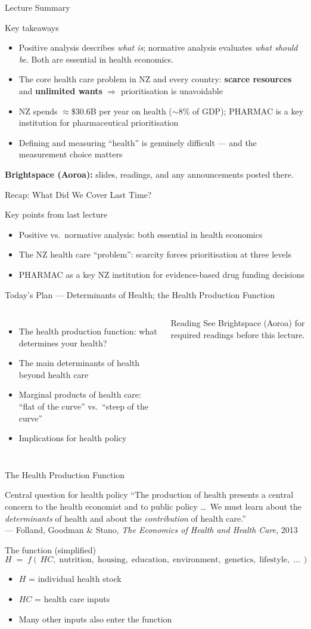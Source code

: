\documentclass[aspectratio=169, 12pt]{beamer}
\newcommand{\recapslide}[1]{%
  \begin{frame}{Recap: What Did We Cover Last Time?}
    \begin{block}{Key points from last lecture}
      \begin{itemize}#1\end{itemize}
    \end{block}
  \end{frame}}
\newcommand{\planslide}[2]{%
  \begin{frame}{Today's Plan — #1}
    \begin{columns}
      \column{0.6\textwidth}
      \begin{itemize}#2\end{itemize}
      \column{0.38\textwidth}
      \begin{alertblock}{Reading}
        \footnotesize See Brightspace (Aoroa) for required readings before this lecture.
      \end{alertblock}
    \end{columns}
  \end{frame}}
\newcommand{\summaryside}[1]{%
  \begin{frame}{Lecture Summary}
    \begin{exampleblock}{Key takeaways}
      \begin{itemize}#1\end{itemize}
    \end{exampleblock}
    \vspace{0.5em}
    {\footnotesize\textcolor{OtagoGold}{\textbf{Brightspace (Aoroa):}} slides, readings, and any announcements posted there.}
  \end{frame}}
\begin{document}
\summaryside{
  \item Positive analysis describes \emph{what is}; normative analysis evaluates \emph{what should be}. Both are essential in health economics.
  \item The core health care problem in NZ and every country: \textbf{scarce resources} and \textbf{unlimited wants} $\Rightarrow$ prioritisation is unavoidable
  \item NZ spends $\approx$\$30.6B per year on health ($\sim$8\% of GDP); PHARMAC is a key institution for pharmaceutical prioritisation
  \item Defining and measuring ``health'' is genuinely difficult --- and the measurement choice matters
}


\recapslide{
  \item Positive vs.\ normative analysis: both essential in health economics
  \item The NZ health care ``problem'': scarcity forces prioritisation at three levels
  \item PHARMAC as a key NZ institution for evidence-based drug funding decisions
}

\planslide{Determinants of Health; the Health Production Function}{
  \item The health production function: what determines your health?
  \item The main determinants of health beyond health care
  \item Marginal products of health care: ``flat of the curve'' vs.\ ``steep of the curve''
  \item Implications for health policy
}

\begin{frame}{The Health Production Function}
  \begin{block}{Central question for health policy}
    ``The production of health presents a central concern to the health economist and to
    public policy \ldots\ We must learn about the \emph{determinants} of health and about the
    \emph{contribution} of health care.'' \\
    {\footnotesize --- Folland, Goodman \& Stano, \textit{The Economics of Health and Health Care}, 2013}
  \end{block}
  \vspace{0.4em}
  \begin{block}{The function (simplified)}
    $$H \;=\; f\!\left(\,HC,\; \text{nutrition},\; \text{housing},\; \text{education},\;
    \text{environment},\; \text{genetics},\; \text{lifestyle},\; \ldots\,\right)$$
    \begin{itemize}
      \item $H$ = individual health stock
      \item $HC$ = health care inputs
      \item Many other inputs also enter the function
    \end{itemize}
  \end{block}
\end{frame}
\end{document}
